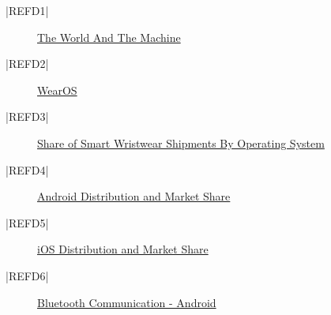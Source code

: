 \begin{center}
    \begin{description}
        \item [|REFD1|] \href{http://mcs.open.ac.uk/mj665/icse17kn.pdf}{The World And The Machine}
        \item [|REFD2|] \href{https://wearos.google.com/}{WearOS}
        \item [|REFD3|] \href{https://www.statista.com/statistics/466563/share-of-smart-wristwear-shipments-by-operating-system-worldwide/}{Share of Smart Wristwear Shipments By Operating System}
        \item [|REFD4|] \href{https://data.apteligent.com/android/}{Android Distribution and Market Share}
        \item [|REFD5|] \href{https://data.apteligent.com/ios/}{iOS  Distribution and Market Share}
        \item [|REFD6|] \href{https://developer.android.com/guide/topics/connectivity/bluetooth
}{Bluetooth Communication - Android}
    \end{description}
\end{center}